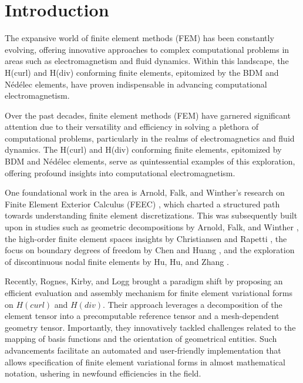 \documentclass[12pt, a4paper]{article}
\begin{document}
\section{Introduction}

The expansive world of finite element methods (FEM) has been constantly
evolving, offering innovative approaches to complex computational problems in
areas such as electromagnetism and fluid dynamics. Within this landscape, the
H(curl) and H(div) conforming finite elements, epitomized by the BDM and Nédélec
elements, have proven indispensable in advancing computational electromagnetism.

Over the past decades, finite element methods (FEM) have garnered significant
attention due to their versatility and efficiency in solving a plethora of
computational problems, particularly in the realms of electromagnetics and fluid
dynamics. The H(curl) and H(div) conforming finite elements, epitomized by BDM
and Nédélec elements, serve as quintessential examples of this exploration,
offering profound insights into computational electromagnetism.

One foundational work in the area is Arnold, Falk, and Winther's research on
Finite Element Exterior Calculus (FEEC) \cite{ArnoldFalkWinther2006}, which
charted a structured path towards understanding finite element discretizations.
This was subsequently built upon in studies such as geometric decompositions by
Arnold, Falk, and Winther \cite{ArnoldFalkWinther2009}, the high-order finite
element spaces insights by Christiansen and Rapetti
\cite{ChristiansenRapetti2016}, the focus on boundary degrees of freedom by Chen
and Huang \cite{Chen;Huang:2021Geometric}, and the exploration of discontinuous
nodal finite elements by Hu, Hu, and Zhang \cite{HuHuZhang2022}.

Recently, Rognes, Kirby, and Logg \cite{RognesKirbyLogg2010} brought a paradigm
shift by proposing an efficient evaluation and assembly mechanism for finite
element variational forms on \( H(curl) \) and \( H(div) \). Their approach
leverages a decomposition of the element tensor into a precomputable reference
tensor and a mesh-dependent geometry tensor. Importantly, they innovatively
tackled challenges related to the mapping of basis functions and the orientation
of geometrical entities. Such advancements facilitate an automated and
user-friendly implementation that allows specification of finite element
variational forms in almost mathematical notation, ushering in newfound
efficiencies in the field.
\end{document}
